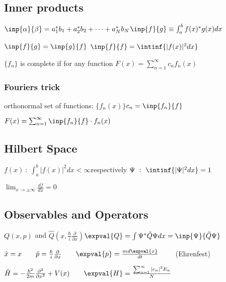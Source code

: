 \documentclass[10pt,a4paper]{scrartcl}
\begin{document}
\begin{multicols*}{3}
	\subsection{Inner products}

	$\inp{\alpha}{\beta}=a_1^*b_1+a_2^*b_2 + \cdots + a_N^*b_N$\hfill$\inp{f}{g}\equiv \int_a^b{f(x)^*g(x)dx}$
	
	\begin{center}
	
	\end{center}
	
	$\inp{f}{g}=\inp{g}{f}$	\hfill $\inp{f}{f}=\intinf{|f(x)|^2dx}$
	
	$\{f_n\}$ is complete if for any function $F(x) = \sum_{n=1}^\infty{c_nf_n(x)}$
	
	\subsubsection{Fouriers trick}
	
	orthonormal set of functions: $\{f_n(x)\}$\hfill\dahe $c_n=\inp{f_n}{f}$
	
	$F(x)=\sum_{n=1}^\infty{\inp{f_n}{f}\cdot f_n(x)}$
	
	\subsection{Hilbert Space}
	
	$f(x)\ :\ \int_a^b{|f(x)|^2dx<\infty}$\hfill respectively \hfill$\Psi\ :\ \intinf{|\Psi|^2dx}=1$
	
	$\lim_{x\rightarrow\pm\infty}{\frac{df}{dx}}=0$
	
	\subsection{Observables and Operators}
	
	$Q(x,p)$ and $\hat{Q}(x,\frac{\hbar}{i}\frac{\partial}{\partial x})$\hfill$\expval{Q}=\int{\Psi^*\hat{Q}\Psi dx}=\inp{\Psi}{\hat{Q}\Psi}$
	
	$\hat{x}=x\qquad\hat{p}=\frac{\hbar}{i}\frac{\partial}{\partial x}\qquad \expval{p}=\frac{m d\expval{x}}{dt}\qquad$ (Ehrenfest)
	
	$ \hat{H}=-\frac{\hbar^2}{2m}\frac{\partial^2}{\partial x^2}+V(x) \qquad \expval{H}=\frac{\sum_{n=1}^\infty{|c_n|^2E_n}}{N}$	
	

\end{multicols*}
\end{document}
